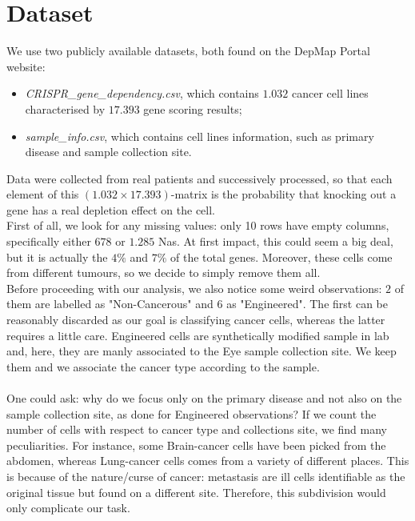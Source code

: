 \documentclass[a4paper,11pt, oneside]{article}  %
\begin{document}
\section{Dataset}
We use two publicly available datasets, both found on the DepMap Portal website:
\begin{itemize}
	\item \textit{CRISPR\_gene\_dependency.csv}, which contains $1.032$ cancer cell lines characterised by $17.393$ gene scoring results; 
	\item \textit{sample\_info.csv}, which contains cell lines information, such as primary disease and sample collection site.
\end{itemize}
Data were collected from real patients and successively processed, so that each element of this $(1.032 \times 17.393)$-matrix is the probability that knocking out a gene has a real depletion effect on the cell. \\
First of all, we look for any missing values: only 10 rows have empty columns, specifically either $678$ or $1.285$ Nas. At first impact, this could seem a big deal, but it is actually the $4\%$ and $7\%$  of the total genes. Moreover, these cells come from different tumours, so we decide to simply remove them all.  \\
Before proceeding with our analysis, we also notice some weird observations: $2$ of them are labelled as "Non-Cancerous" and $6$ as "Engineered". The first can be reasonably discarded as our goal is classifying cancer cells, whereas the latter requires a little care. Engineered cells are synthetically modified sample in lab and, here, they are manly associated to the Eye sample collection site. We keep them and we associate the cancer type according to the sample. \\ \\
One could ask: why do we focus only on the primary disease and not also on the sample collection site, as done for Engineered observations? If we count the number of cells with respect to cancer type and collections site, we find many peculiarities. For instance, some Brain-cancer cells have been picked from the abdomen, whereas Lung-cancer cells comes from a variety of different places. This is because of the nature/curse of cancer: metastasis are ill cells identifiable as the original tissue but found on a different site. Therefore, this subdivision would only complicate our task. 
\end{document}
